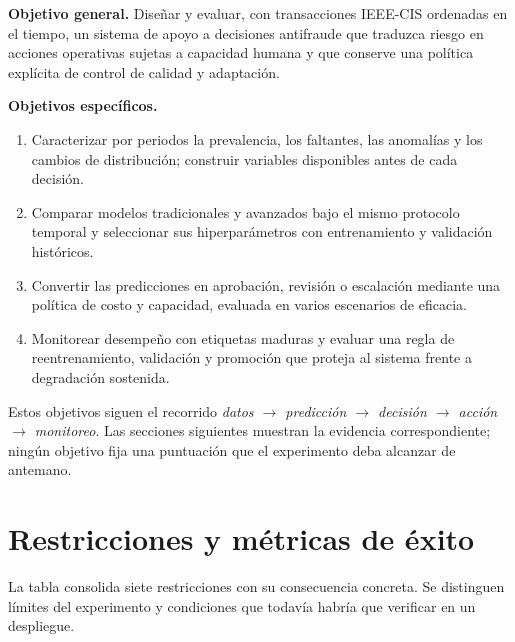 \documentclass[11pt,letterpaper]{article}
\begin{document}
\textbf{Objetivo general.} Diseñar y evaluar, con transacciones IEEE-CIS ordenadas en el tiempo, un sistema de apoyo a decisiones antifraude que traduzca riesgo en acciones operativas sujetas a capacidad humana y que conserve una política explícita de control de calidad y adaptación.

\textbf{Objetivos específicos.}
\begin{enumerate}\setlength{\itemsep}{2pt}\setlength{\topsep}{2pt}
\item Caracterizar por periodos la prevalencia, los faltantes, las anomalías y los cambios de distribución; construir variables disponibles antes de cada decisión.
\item Comparar modelos tradicionales y avanzados bajo el mismo protocolo temporal y seleccionar sus hiperparámetros con entrenamiento y validación históricos.
\item Convertir las predicciones en aprobación, revisión o escalación mediante una política de costo y capacidad, evaluada en varios escenarios de eficacia.
\item Monitorear desempeño con etiquetas maduras y evaluar una regla de reentrenamiento, validación y promoción que proteja al sistema frente a degradación sostenida.
\end{enumerate}

Estos objetivos siguen el recorrido \emph{datos $\rightarrow$ predicción $\rightarrow$ decisión $\rightarrow$ acción $\rightarrow$ monitoreo}. Las secciones siguientes muestran la evidencia correspondiente; ningún objetivo fija una puntuación que el experimento deba alcanzar de antemano.

\clearpage
\section{Restricciones y métricas de éxito}
La tabla consolida siete restricciones con su consecuencia concreta. Se distinguen límites del experimento y condiciones que todavía habría que verificar en un despliegue.
\end{document}
